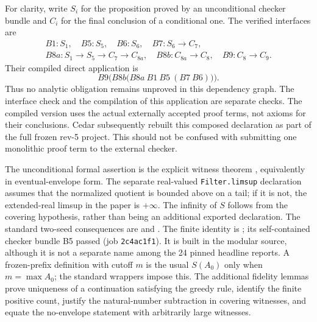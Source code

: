 \documentclass[11pt]{article}
\begin{document}
For clarity, write $S_i$ for the proposition proved by an unconditional checker
bundle and $C_i$ for the final conclusion of a conditional one. The verified
interfaces are
\[
\begin{gathered}
 B1:S_1,\quad B5:S_5,\quad B6:S_6,\quad B7:S_6\to C_7,\\
 B8a:S_1\to S_5\to C_7\to C_{8a},\quad
 B8b:C_{8a}\to C_8,\quad B9:C_8\to C_9.
\end{gathered}
\]
Their compiled direct application is
\[
 B9\bigl(B8b\bigl(B8a\ B1\ B5\ (B7\ B6)\bigr)\bigr).
\]
Thus no analytic obligation remains unproved in this dependency graph. The
interface check and the compilation of this application are separate checks.
The compiled version uses the actual externally accepted proof terms, not axioms
for their conclusions. Cedar subsequently rebuilt this composed declaration as
part of the full frozen rev-5 project. This should not be confused with submitting
one monolithic proof term to the external checker.

\begin{sloppypar}
The unconditional formal assertion is the explicit witness theorem
, equivalently
 in eventual-envelope form.
The separate real-valued \texttt{Filter.limsup} declaration
 assumes that the normalized quotient
is bounded above on a tail; if it is not, the extended-real limsup in the paper
is $+\infty$. The infinity of $S$ follows from the covering hypothesis, rather
than being an additional exported declaration.
The standard two-seed consequences are
 and
.
The finite identity is
; its self-contained
checker bundle B5 passed (job \texttt{2c4ac1f1}). It is built in the modular
source, although it is not a separate name among the 24 pinned headline reports.
A frozen-prefix definition with cutoff $m$ is the usual $S(A_0)$ only when
$m=\max A_0$; the standard wrappers impose this. The additional fidelity lemmas
prove uniqueness of a continuation satisfying the greedy rule, identify the
finite positive count, justify the natural-number subtraction in covering
witnesses, and equate the no-envelope statement with arbitrarily large witnesses.
\end{sloppypar}
\end{document}
